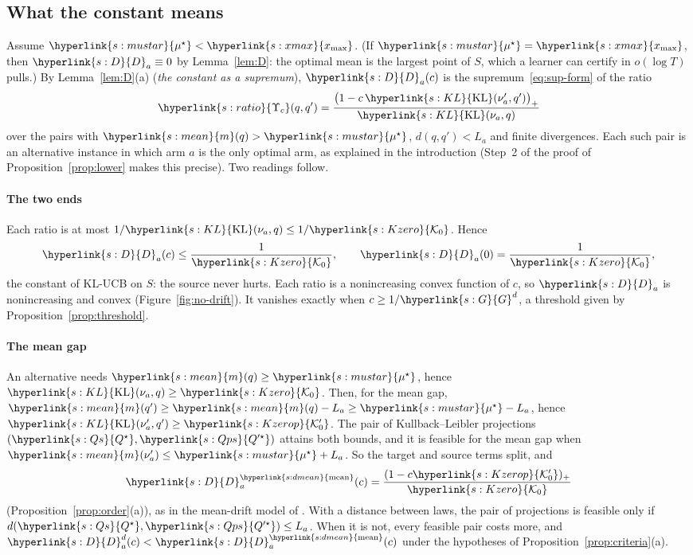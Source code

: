 \documentclass[11pt]{article}
\newcommand{\sy}[2]{{\hyperlink{#1}{#2}}}
\newcommand{\xmax}{\sy{s:xmax}{x_{\max}}}
\newcommand{\mean}{\sy{s:mean}{m}}
\newcommand{\KL}{\sy{s:KL}{\mathrm{KL}}}
\newcommand{\dmean}{\sy{s:dmean}{\mathrm{mean}}}
\newcommand{\mus}{\sy{s:mustar}{\mu^{\star}}}
\newcommand{\Dc}{\sy{s:D}{D}}
\newcommand{\Ko}{\sy{s:Kzero}{\mathcal{K}_{0}}}
\newcommand{\Kop}{\sy{s:Kzerop}{\mathcal{K}'_{0}}}
\newcommand{\Qs}{\sy{s:Qs}{Q^{\star}}}
\newcommand{\Qps}{\sy{s:Qps}{Q'^{\star}}}
\newcommand{\Rat}{\sy{s:ratio}{\Upsilon_{c}}}
\newcommand{\Gd}{\sy{s:G}{G}}
\begin{document}
\subsection{What the constant means}\label{sec:meaning}

Assume $\mus<\xmax$. (If $\mus=\xmax$, then $\Dc_a\equiv0$ by Lemma~\ref{lem:D}: the
optimal mean is the largest point of $S$, which a learner can certify in $o(\log T)$ pulls.) By
Lemma~\ref{lem:D}(a) (\emph{the constant as a supremum}), $\Dc_a(c)$ is the
supremum~\eqref{eq:sup-form} of the ratio
\begin{equation*}
\Rat(q,q')=\frac{\big(1-c\,\KL(\nu'_a,q')\big)_+}{\KL(\nu_a,q)}
\end{equation*}
over the pairs with $\mean(q)>\mus$, $d(q,q')<L_a$ and finite divergences. Each such pair is an
alternative instance in which arm $a$ is the only optimal arm, as explained in the introduction
(Step~2 of the proof of Proposition~\ref{prop:lower} makes this precise). Two readings follow.

\paragraph{The two ends} Each ratio is at most $1/\KL(\nu_a,q)\le1/\Ko$. Hence
\begin{equation*}
\Dc_a(c)\le\frac1{\Ko},\qquad \Dc_a(0)=\frac1{\Ko},
\end{equation*}
the constant of KL-UCB on $S$: the source never hurts. Each ratio is a nonincreasing convex function
of $c$, so $\Dc_a$ is nonincreasing and convex (Figure~\ref{fig:no-drift}). It vanishes exactly when
$c\ge1/\Gd^d$, a threshold given by Proposition~\ref{prop:threshold}.

\paragraph{The mean gap} An alternative needs $\mean(q)\ge\mus$, hence $\KL(\nu_a,q)\ge\Ko$. Then,
for the mean gap, $\mean(q')\ge \mean(q)-L_a\ge\mus-L_a$, hence $\KL(\nu'_a,q')\ge\Kop$. The pair of
Kullback--Leibler projections $(\Qs,\Qps)$ attains both bounds, and it is feasible for the mean gap
when $\mean(\nu'_a)\le\mus+L_a$. So the target and source terms split, and
\begin{equation*}
\Dc^{\dmean}_a(c)=\frac{(1-c\Kop)_+}{\Ko}
\end{equation*}
(Proposition~\ref{prop:order}(a)), as in the mean-drift model of \citet{PMRM26}. With a distance
between laws, the pair of projections is feasible only if $d(\Qs,\Qps)\le L_a$. When it is not,
every feasible pair costs more, and $\Dc^d_a(c)<\Dc^{\dmean}_a(c)$ under the hypotheses of
Proposition~\ref{prop:criteria}(a).
\end{document}
